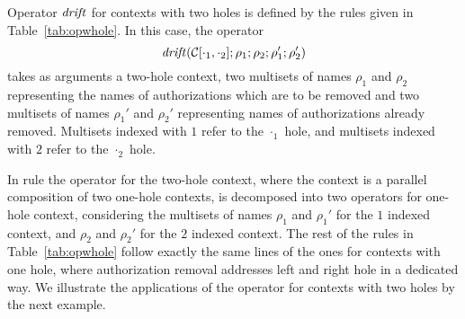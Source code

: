 %
%
Operator $\mathit {drift}$ for contexts with two holes is defined by the rules given in Table~\ref{tab:opwhole}.
In this case, the operator 
\[
     \mathit {drift}(\mathcal{C}[\cdot_1,\cdot_2];\rho_1
 ;\rho_2
 ;\rho_1'
 ;\rho_2'
 )
 \]
 takes as arguments a two-hole context, two multisets
 of names $\rho_1
 $ and $\rho_2
 $ representing the names of authorizations which are to be removed and two multisets
  of names $\rho_1'
  $ and $\rho_2'
  $ representing names of authorizations already removed. Multisets indexed with $1$ refer to the $\cdot_1$ hole, and multisets indexed with $2$ refer to the $\cdot_2$ hole.


In rule  the operator for the two-hole context, where the context is a parallel composition of two one-hole contexts, is decomposed into two operators for one-hole context, considering the multisets of names 
$\rho_1$ and $\rho_1'$ for the $1$ indexed context, and
$\rho_2$ and $\rho_2'$ for the $2$ indexed context. The rest of the rules in Table~\ref{tab:opwhole} follow exactly the same lines of the ones for contexts with one hole, where authorization removal addresses left and right hole in a dedicated way.
%
We illustrate the applications of the operator for contexts with two holes by the next example.

